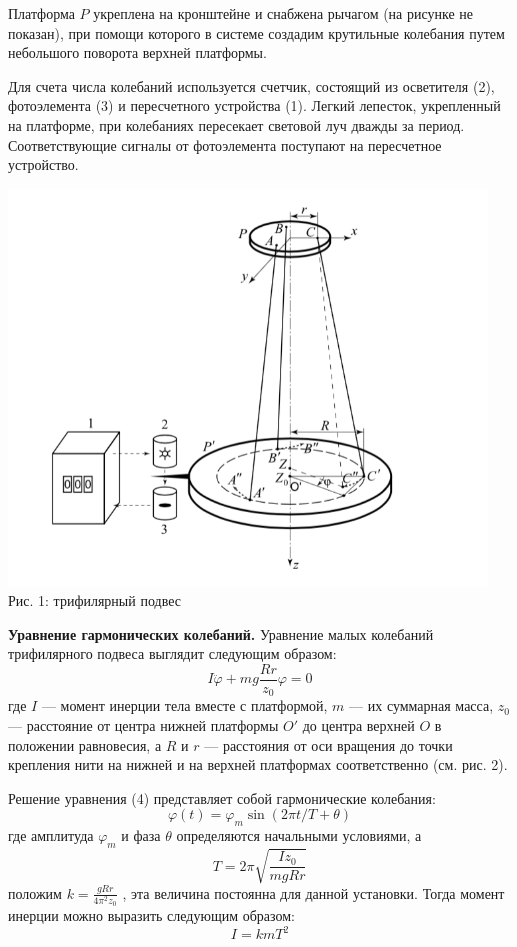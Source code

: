 \documentclass[12pt]{article}
\begin{document}
    Платформа $P$ укреплена на кронштейне и снабжена рычагом (на рисунке не показан), при помощи которого в системе создадим крутильные колебания путем небольшого поворота верхней платформы.

    Для счета числа колебаний используется счетчик, состоящий из осветителя (2), фотоэлемента (3) и пересчетного устройства (1). Легкий лепесток, укрепленный на платформе, при колебаниях пересекает световой луч дважды за период. Соответствующие сигналы от фотоэлемента поступают на пересчетное устройство.

    \begin{center} 
        \includegraphics[width=5in]{lab2_1.png} \\ Рис. 1: трифилярный подвес
    \end{center}
    
    \textbf{Уравнение гармонических колебаний.} Уравнение малых колебаний трифилярного подвеса выглядит следующим образом:
    \begin{equation}
        I\ddot{\varphi} + mg \frac{Rr}{z_0}\varphi = 0
    \end{equation} 
    где $I$ — момент инерции тела вместе с платформой, $m$ — их суммарная масса, $z_0$ — расстояние от центра нижней платформы $O'$ до центра верхней $O$ в положении равновесия, а $R$ и $r$ — расстояния от оси вращения до точки крепления нити на нижней и на верхней платформах соответственно (см. рис. 2).

    Решение уравнения (4) представляет собой гармонические колебания:
    \begin{equation}
        \varphi(t) = \varphi_m \sin(2\pi t/T + \theta)
    \end{equation} 
    где амплитуда $\varphi_m$ и фаза $\theta$ определяются начальными условиями, а
    \begin{equation}
        T = 2 \pi \sqrt{\frac{I z_0}{mgRr}}
    \end{equation} 
    положим $k = \frac{gRr}{4\pi^2z_0}$ , эта величина постоянна для данной установки. Тогда момент инерции можно выразить следующим образом:
    \begin{equation}
        I = kmT^2
    \end{equation}
\end{document}
